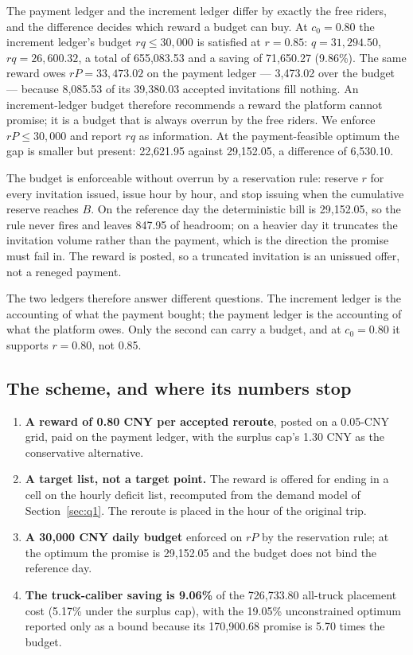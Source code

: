 The payment ledger and the increment ledger differ by exactly the free riders, and the
difference decides which reward a budget can buy. At $c_0=0.80$ the increment ledger's
budget $rq\le30{,}000$ is satisfied at $r=0.85$: $q=31{,}294.50$, $rq=26{,}600.32$, a
total of 655,083.53 and a saving of 71,650.27 (9.86\%). The same reward owes
$rP=33{,}473.02$ on the payment ledger --- 3,473.02 over the budget --- because 8,085.53
of its 39,380.03 accepted invitations fill nothing. An increment-ledger budget therefore
recommends a reward the platform cannot promise; it is a budget that is always overrun
by the free riders. We enforce $rP\le30{,}000$ and report $rq$ as information. At the
payment-feasible optimum the gap is smaller but present: 22,621.95 against 29,152.05, a
difference of 6,530.10.

The budget is enforceable without overrun by a reservation rule: reserve $r$ for every
invitation issued, issue hour by hour, and stop issuing when the cumulative reserve
reaches $B$. On the reference day the deterministic bill is 29,152.05, so the rule never
fires and leaves 847.95 of headroom; on a heavier day it truncates the invitation
volume rather than the payment, which is the direction the promise must fail in. The
reward is posted, so a truncated invitation is an unissued offer, not a reneged payment.

The two ledgers therefore answer different questions. The increment ledger is the
accounting of what the payment bought; the payment ledger is the accounting of what the
platform owes. Only the second can carry a budget, and at $c_0=0.80$ it supports
$r=0.80$, not 0.85.

\subsection{The scheme, and where its numbers stop}

\begin{enumerate}[leftmargin=1.6em]
\item \textbf{A reward of 0.80 CNY per accepted reroute}, posted on a 0.05-CNY grid,
  paid on the payment ledger, with the surplus cap's 1.30 CNY as the conservative
  alternative.
\item \textbf{A target list, not a target point.} The reward is offered for ending in a
  cell on the hourly deficit list, recomputed from the demand model of
  Section~\ref{sec:q1}. The reroute is placed in the hour of the original trip.
\item \textbf{A 30,000 CNY daily budget} enforced on $rP$ by the reservation rule; at the
  optimum the promise is 29,152.05 and the budget does not bind the reference day.
\item \textbf{The truck-caliber saving is 9.06\%} of the 726,733.80 all-truck placement
  cost (5.17\% under the surplus cap), with the 19.05\% unconstrained optimum reported
  only as a bound because its 170,900.68 promise is 5.70 times the budget.
\end{enumerate}

